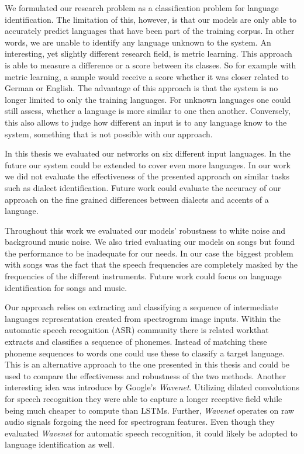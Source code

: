 We formulated our research problem as a classification problem for language identification. The limitation of this, however, is that our models are only able to accurately predict languages that have been part of the training corpus. In other words, we are unable to identify any language unknown to the system. An interesting, yet slightly different research field, is metric learning. This approach is able to measure a difference or a score between its classes. So for example with metric learning, a sample would receive a score whether it was closer related to German or English. The advantage of this approach is that the system is no longer limited to only the training languages. For unknown languages one could still assess, whether a language is more similar to one then another. Conversely, this also allows to judge how different an input is to any language know to the system, something that is not possible with our approach.

In this thesis we evaluated our networks on six different input languages. In the future our system could be extended to cover even more languages. In our work we did not evaluate the effectiveness of the presented approach on similar tasks such as dialect identification. Future work could evaluate the accuracy of our approach on the fine grained differences between dialects and accents of a language.

Throughout this work we evaluated our models' robustness to white noise and background music noise. We also tried evaluating our models on songs but found the performance to be inadequate for our needs. In our case the biggest problem with songs was the fact that the speech frequencies are completely masked by the frequencies of the different instruments. Future work could focus on language identification for songs and music.

Our approach relies on extracting and classifying a sequence of intermediate languages representation created from spectrogram image inputs. Within the automatic speech recognition (ASR) community there is related work\cite{song2015end}that extracts and classifies a sequence of phonemes. Instead of matching these phoneme sequences to words one could use these to classify a target language. This is an alternative approach to the one presented in this thesis and could be used to compare the effectiveness and robustness of the two methods. Another interesting idea was introduce by Google's \emph{Wavenet}\cite{van2016wavenet}. Utilizing dilated convolutions for speech recognition they were able to capture a longer receptive field while being much cheaper to compute than LSTMs. Further, \emph{Wavenet} operates on raw audio signals forgoing the need for spectrogram features.  Even though they evaluated \emph{Wavenet} for automatic speech recognition, it could likely be adopted to language identification as well. 


